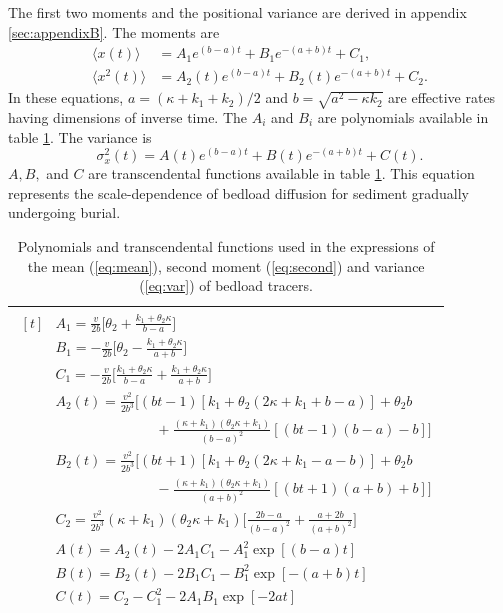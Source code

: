 \documentclass[]{agujournal2018}
\newcommand\be{\begin{equation}}
\newcommand\ee{\end{equation}}
\newcommand\bra{\langle}
\newcommand\ket{\rangle}
\begin{document}
 The first two moments and the positional variance are derived in appendix \ref{sec:appendixB}.
The moments are
\begin{align}
\bra x(t) \ket &= A_1 e^{(b-a)t}+B_1e^{-(a+b)t}+C_1, \label{eq:mean}\\
\bra x^2(t) \ket &= A_2(t)e^{(b-a)t}+B_2(t)e^{-(a+b)t}+C_2. \label{eq:second}
\end{align}
In these equations, $a = (\kappa + k_1+k_2)/2$ and $b = \sqrt{a^2-\kappa k_2}$ are effective rates having dimensions of inverse time.
The $A_i$ and $B_i$ are polynomials available in table \ref{table:params}.
The variance is
\be \sigma_x^2(t) = A(t)e^{(b-a)t} + B(t)e^{-(a+b)t} + C(t). \label{eq:var}\ee
$A, B,$ and $C$ are transcendental functions available in table \ref{table:params}.
This equation represents the scale-dependence of bedload diffusion for sediment gradually undergoing burial.
\begin{table}[!h]
	\centering
	\caption{Polynomials and transcendental functions used in the expressions of the mean (\ref{eq:mean}), second moment (\ref{eq:second}) and variance (\ref{eq:var}) of bedload tracers.}
	\label{table:params}
	\begin{tabular}{c}
		\toprule
		$\begin{aligned}[t]
		&A_1 = \frac{v}{2b}\big[\theta_2+\frac{k_1+\theta_2\kappa}{b-a}\big] \\
		&B_1 = -\frac{v}{2b}\big[\theta_2-\frac{k_1+\theta_2 \kappa}{a+b}\big] \\
		&C_1 =  -\frac{v}{2b}\big[\frac{k_1+\theta_2 \kappa}{b-a}+\frac{k_1+\theta_2 \kappa}{a+b}\big]\\
		&A_2(t) = \frac{v^2}{2b^3}\Big[(bt-1)[k_1+\theta_2(2\kappa + k_1 + b-a)]+\theta_2b \\
		&\hspace{3cm} + \frac{(\kappa+k_1)(\theta_2\kappa+k_1)}{(b-a)^2}[(bt-1)(b-a)-b]\Big]\\
		&B_2(t) = \frac{v^2}{2b^3}\Big[(bt+1)[k_1 + \theta_2(2\kappa+k_1-a-b)]+\theta_2b\\
		&\hspace{3cm} -\frac{(\kappa+k_1)(\theta_2\kappa+k_1)}{(a+b)^2}[(bt+1)(a+b)+b]\Big]\\
		&C_2 = \frac{v^2}{2b^3}(\kappa+k_1)(\theta_2 \kappa + k_1)\Big[\frac{2b-a}{(b-a)^2}+\frac{a+2b}{(a+b)^2}\Big]\\
		&A(t) = A_2(t)-2A_1C_1 - A_1^2\exp[(b-a)t]\\
		&B(t) = B_2(t)-2B_1C_1 - B_1^2\exp[-(a+b)t]\\
		&C(t) = C_2-C_1^2-2A_1B_1\exp[-2at]\\			
		\end{aligned}$\\
		\bottomrule
	\end{tabular}
\end{table}
\end{document}
